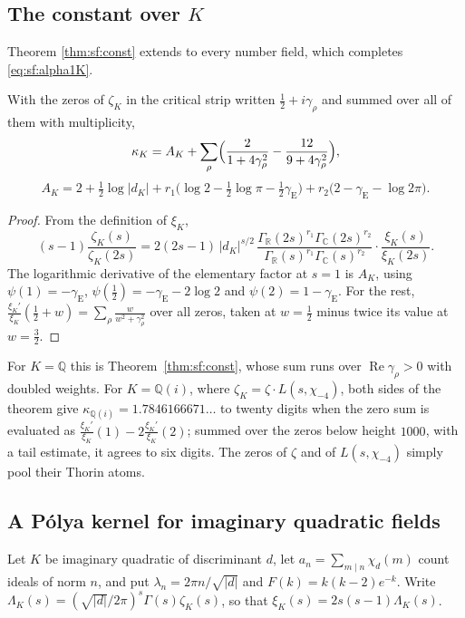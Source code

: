 \subsection{The constant over $K$}
Theorem \ref{thm:sf:const} extends to every number field, which completes \eqref{eq:sf:alpha1K}.

\begin{theorem}\label{thm:sf:constK}
With the zeros of $\zeta_K$ in the critical strip written $\frac12+i\gamma_\rho$ and summed over all of them with multiplicity,
\[
\kappa_K=A_K+\sum_\rho\Bigl(\frac{2}{1+4\gamma_\rho^2}-\frac{12}{9+4\gamma_\rho^2}\Bigr),
\]
\[
A_K=2+\tfrac12\log|d_K|+r_1\bigl(\log2-\tfrac12\log\pi-\tfrac12\gamma_{\mathrm E}\bigr)+r_2\bigl(2-\gamma_{\mathrm E}-\log2\pi\bigr).
\]
\end{theorem}

\begin{proof}
From the definition of $\xi_K$,
\[
(s-1)\frac{\zeta_K(s)}{\zeta_K(2s)}=2(2s-1)\,|d_K|^{s/2}\,\frac{\Gamma_{\mathbb R}(2s)^{r_1}\Gamma_{\mathbb C}(2s)^{r_2}}{\Gamma_{\mathbb R}(s)^{r_1}\Gamma_{\mathbb C}(s)^{r_2}}\cdot\frac{\xi_K(s)}{\xi_K(2s)} .
\]
The logarithmic derivative of the elementary factor at $s=1$ is $A_K$, using $\psi(1)=-\gamma_{\mathrm E}$, $\psi(\frac12)=-\gamma_{\mathrm E}-2\log2$ and $\psi(2)=1-\gamma_{\mathrm E}$. For the rest, $\frac{\xi_K'}{\xi_K}(\frac12+w)=\sum_\rho\frac{w}{w^2+\gamma_\rho^2}$ over all zeros, taken at $w=\frac12$ minus twice its value at $w=\frac32$.
\end{proof}

For $K=\mathbb Q$ this is Theorem~\ref{thm:sf:const}, whose sum runs over $\operatorname{Re}\gamma_\rho>0$ with doubled weights. For $K=\mathbb Q(i)$, where $\zeta_K=\zeta\cdot L(s,\chi_{-4})$, both sides of the theorem give $\kappa_{\mathbb Q(i)}=1.7846166671\ldots$ to twenty digits when the zero sum is evaluated as $\frac{\xi_K'}{\xi_K}(1)-2\frac{\xi_K'}{\xi_K}(2)$; summed over the zeros below height $1000$, with a tail estimate, it agrees to six digits. The zeros of $\zeta$ and of $L(s,\chi_{-4})$ simply pool their Thorin atoms.

\subsection{A P\'olya kernel for imaginary quadratic fields}
Let $K$ be imaginary quadratic of discriminant $d$, let $a_n=\sum_{m\mid n}\chi_d(m)$ count ideals of norm $n$, and put $\lambda_n=2\pi n/\sqrt{|d|}$ and $F(k)=k(k-2)e^{-k}$. Write $\Lambda_K(s)=(\sqrt{|d|}/2\pi)^s\Gamma(s)\zeta_K(s)$, so that $\xi_K(s)=2s(s-1)\Lambda_K(s)$.

